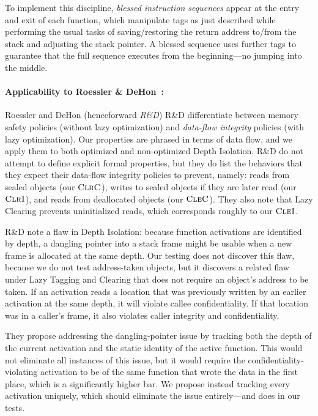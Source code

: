 \documentclass[10pt,conference]{ieeetran}%
\theoremstyle{definition}
\begin{document}
To implement this discipline, {\em blessed instruction sequences} appear at
the entry and exit of each function, which manipulate tags as just described
while performing the usual tasks of saving/restoring the return address to/from
the stack and adjusting the stack pointer. A blessed sequence uses further tags
to guarantee that the full sequence executes from the beginning---no jumping into the middle.

\paragraph*{Applicability to Roessler \& DeHon~\cite{DBLP:conf/sp/RoesslerD18}:}

Roessler and DeHon (henceforward \emph{R\&D})
R\&D differentiate between memory safety policies (without lazy optimization)
and {\em data-flow integrity} policies (with lazy optimization). Our properties
are phrased in terms of data flow, and we apply them to both optimized and non-optimized
Depth Isolation.
R\&D do not attempt to define explicit formal properties, but they do list the
behaviors that they expect their data-flow integrity policies to prevent, namely:
reads from sealed objects
(our \(\textnormal{\sc ClrC}\)), writes to sealed objects
if they are later read (our \(\textnormal{\sc ClrI}\)), and reads
from deallocated objects (our \(\textnormal{\sc CleC}\)).
They also note that Lazy Clearing prevents uninitialized reads,
which corresponds roughly to our \(\textnormal{\sc CleI}\).

R\&D note a flaw in Depth Isolation: because function activations
are identified by depth, a dangling pointer into a stack frame might be usable
when a new frame is allocated at the same depth. Our testing does not discover
this flaw, because we do not test address-taken objects, but it discovers a
related flaw under Lazy Tagging and Clearing that does not require
an object's address to be taken. If an activation reads a location
that was previously written by an earlier activation at the same depth, it will
violate callee confidentiality. If that location was in a caller's frame,
it also violates caller integrity and confidentiality.

They propose addressing the dangling-pointer issue by
tracking both the depth of the current activation and the static identity
of the active function. This would not eliminate all instances of this issue, but it
would require the confidentiality-violating activation to be of the same
function that wrote the data in the first place, which is a significantly higher bar.
We propose instead tracking every activation uniquely, which should eliminate the
issue entirely---and does in our tests.
\end{document}
